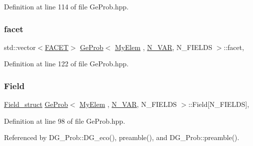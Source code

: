 Definition at line 114 of file Ge\+Prob.\+hpp.

\mbox{\label{classGeProb_a876f8c65be4b17f3c2b7b4b0605f34c1}} 
\subsubsection{\texorpdfstring{facet}{facet}}
{\footnotesize\ttfamily std\+::vector$<$\hyperlink{structFACET}{F\+A\+C\+ET}$>$ \hyperlink{classGeProb}{Ge\+Prob}$<$ \hyperlink{DG__Prob_8h_a83cd887ced9a6587428f267e50cd4787}{My\+Elem} , \hyperlink{classED__Prob_a4e7d2ff1a8e435e336fb00c527224b5a}{N\+\_\+\+V\+AR}, N\+\_\+\+F\+I\+E\+L\+DS $>$\+::facet\hspace{0.3cm}{\ttfamily [protected]}, {\ttfamily [inherited]}}



Definition at line 122 of file Ge\+Prob.\+hpp.

\mbox{\label{classGeProb_aaaeb3e022301e2df5e180af7900a352e}} 
\subsubsection{\texorpdfstring{Field}{Field}}
{\footnotesize\ttfamily \hyperlink{structField__struct}{Field\+\_\+struct} \hyperlink{classGeProb}{Ge\+Prob}$<$ \hyperlink{DG__Prob_8h_a83cd887ced9a6587428f267e50cd4787}{My\+Elem} , \hyperlink{classED__Prob_a4e7d2ff1a8e435e336fb00c527224b5a}{N\+\_\+\+V\+AR}, N\+\_\+\+F\+I\+E\+L\+DS $>$\+::Field\mbox{[}N\+\_\+\+F\+I\+E\+L\+DS\mbox{]}\hspace{0.3cm}{\ttfamily [protected]}, {\ttfamily [inherited]}}



Definition at line 98 of file Ge\+Prob.\+hpp.



Referenced by D\+G\+\_\+\+Prob\+::\+D\+G\+\_\+eco(), preamble(), and D\+G\+\_\+\+Prob\+::preamble().

\mbox{\label{classGeProb_a520a47a06c38cfe59938d2bbd65773a2}} 
